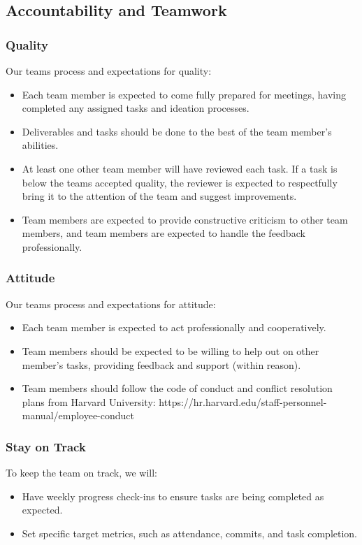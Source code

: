 \documentclass{article}
\begin{document}
\subsection*{Accountability and Teamwork}
\subsubsection*{Quality}
Our teams process and expectations for quality:
\begin{itemize}
  \item Each team member is expected to come fully prepared for meetings, having completed any assigned tasks and ideation processes. 
  \item Deliverables and tasks should be done to the best of the team member's abilities.
  \item At least one other team member will have reviewed each task. If a task is below the teams accepted quality, the reviewer is expected to respectfully bring it to the attention of the team and suggest improvements.
  \item Team members are expected to provide constructive criticism to other team members, and team members are expected to handle the feedback professionally. 
\end{itemize}

\subsubsection*{Attitude}
Our teams process and expectations for attitude:
\begin{itemize}
  \item Each team member is expected to act professionally and cooperatively.
  \item Team members should be expected to be willing to help out on other member's tasks, providing feedback and support (within reason).
  \item Team members should follow the code of conduct and conflict resolution plans from Harvard University:  https://hr.harvard.edu/staff-personnel-manual/employee-conduct
\end{itemize}

\subsubsection*{Stay on Track}
To keep the team on track, we will:
\begin{itemize}
    \item Have weekly progress check-ins to ensure tasks are being completed as expected.
    \item Set specific target metrics, such as attendance, commits, and task completion. 
\end{itemize}
\end{document}
